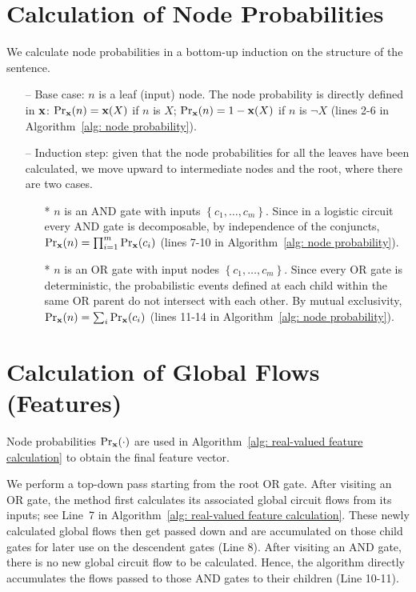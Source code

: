 \documentclass[letterpaper]{article} %
\newcommand{\sample}{{\bf x}}
\begin{document}
 \section{Calculation of Node Probabilities}
 \label{section: node probabilities}
We calculate node probabilities in a bottom-up induction on the structure of the sentence.

\begin{itemize}
\item[--] Base case: $n$ is a leaf (input) node. The node probability is directly defined in $\sample$: $\Pr_\sample(n) = \sample(X)$ if $n$ is $X$; $\Pr_\sample(n) = 1 - \sample(X)$ if $n$ is $\neg X$ (lines 2-6 in Algorithm~\ref{alg: node probability}).
\item[--] Induction step: given that the node probabilities for all the leaves have been calculated, we move upward to intermediate nodes and the root, where there are two cases.
\begin{itemize}
 \item[*] $n$ is an AND gate with inputs $\left\{c_1,\dots,c_m \right\}$. Since in a logistic circuit every AND gate is decomposable, by independence of the conjuncts, $\Pr_\sample(n) = \prod_{i=1}^m \Pr_\sample(c_i)$ (lines 7-10 in Algorithm~\ref{alg: node probability}).
 \item[*] $n$ is an OR gate with input nodes $\left\{c_1,\dots,c_m\right\}$. Since every OR gate is deterministic, the probabilistic events defined at each child within the same OR parent do not intersect with each other. By mutual exclusivity, $\Pr_\sample(n) = \sum _i \Pr_\sample(c_i)$ (lines 11-14 in Algorithm~\ref{alg: node probability}).
 \end{itemize}
\end{itemize}
        
 \section{Calculation of Global Flows (Features)}
 \label{appendix: feature calculation}
 Node probabilities $\Pr_\sample(\cdot)$ are used in Algorithm~\ref{alg: real-valued feature calculation} to obtain the final feature vector. 

 We perform a top-down pass starting from the root OR gate. After visiting an OR gate,  the method first calculates its associated global circuit flows from its inputs; see Line~7 in Algorithm~\ref{alg: real-valued feature calculation}. These newly calculated global flows then get passed down and are accumulated on those child gates for later use on the descendent gates (Line 8). After visiting an AND gate, there is no new global circuit flow to be calculated. Hence, the algorithm directly accumulates the flows passed to those AND gates to their children (Line 10-11).
 \label{s: calculation of global flows}
 
\end{document}
